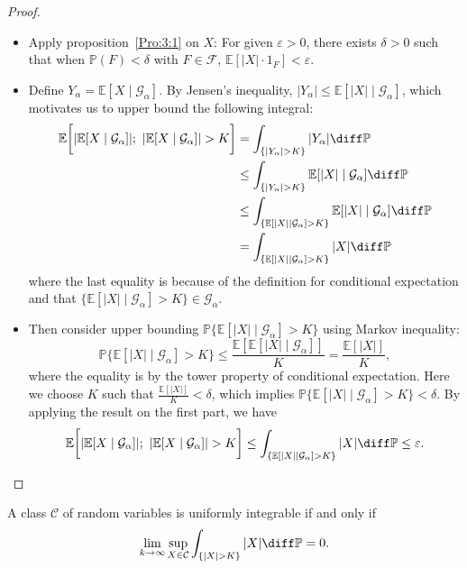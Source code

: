 \begin{proof}
\begin{itemize}
\item
Apply proposition~\ref{Pro:3:1} on $X$:
For given $\varepsilon>0$, there exists $\delta>0$ such that when $\mathbb{P}(F)<\delta$ with $F\in\mathcal{F}$, $\mathbb{E}[|X|\cdot 1_F]<\varepsilon$.
\item
Define $Y_{\alpha}=\mathbb{E}[X\mid\mathcal{G}_{\alpha}]$. By Jensen's inequality,
$|Y_{\alpha}|\le \mathbb{E}[|X|\mid\mathcal{G}_{\alpha}]$, which motivates us to upper bound the following integral:
\begin{align*}
\mathbb{E}\bigg[
|\mathbb{E}[X\mid\mathcal{G}_{\alpha}]|;~
|\mathbb{E}[X\mid\mathcal{G}_{\alpha}]|>K
\bigg]
&=
\int_{\{|Y_{\alpha}|>K\}}|Y_{\alpha}|\diff\mathbb{P}\\
&\le
\int_{\{|Y_{\alpha}|>K\}}\mathbb{E}[|X|\mid\mathcal{G}_{\alpha}]\diff\mathbb{P}\\
&\le
\int_{\{\mathbb{E}[|X|\mid\mathcal{G}_{\alpha}]>K\}}\mathbb{E}[|X|\mid\mathcal{G}_{\alpha}]\diff\mathbb{P}\\
&=
\int_{\{\mathbb{E}[|X|\mid\mathcal{G}_{\alpha}]>K\}}|X|\diff\mathbb{P}
\end{align*}
where the last equality is because of the definition for conditional expectation and that $\{\mathbb{E}[|X|\mid\mathcal{G}_{\alpha}]>K\}\in\mathcal{G}_{\alpha}$.
\item
Then consider upper bounding $\mathbb{P}\{\mathbb{E}[|X|\mid\mathcal{G}_{\alpha}]>K\}$ using Markov inequality:
\[
\mathbb{P}\{\mathbb{E}[|X|\mid\mathcal{G}_{\alpha}]>K\}
\le
\frac{\mathbb{E}[\mathbb{E}[|X|\mid\mathcal{G}_{\alpha}]]}{K}
=
\frac{\mathbb{E}[|X|]}{K},
\]
where the equality is by the tower property of conditional expectation.
Here we choose $K$ such that $\frac{\mathbb{E}[|X|]}{K}<\delta$, which implies 
$\mathbb{P}\{\mathbb{E}[|X|\mid\mathcal{G}_{\alpha}]>K\}<\delta$.
By applying the result on the first part, we have
\[
\mathbb{E}\bigg[
|\mathbb{E}[X\mid\mathcal{G}_{\alpha}]|;~
|\mathbb{E}[X\mid\mathcal{G}_{\alpha}]|>K
\bigg]
\le 
\int_{\{\mathbb{E}[|X|\mid\mathcal{G}_{\alpha}]>K\}}|X|\diff\mathbb{P}
\le\varepsilon.
\]

\end{itemize}
\end{proof}
\begin{remark}
A class $\mathcal{C}$ of random variables is uniformly integrable if and only if 
\[
\lim_{k\to\infty}\sup_{X\in\mathcal{C}}\int_{\{|X|>K\}}|X|\diff\mathbb{P}=0.
\]
\end{remark}
